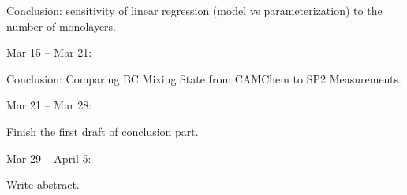 \documentclass[11pt]{article}
\begin{document}
\begin{enumerate}
		Conclusion: sensitivity of linear regression (model vs parameterization) to the number of monolayers.
		
		\bigskip
		\bigskip
		\bigskip
		
		Mar 15 -- Mar 21:
		
		Conclusion: Comparing BC Mixing State from CAMChem to SP2 Measurements.
		
		\bigskip
		
		Mar 21 -- Mar 28:
		
		Finish the first draft of conclusion part.
		
		
		\bigskip
		
		Mar 29 -- April 5:
		
		Write abstract.
		
		
		\bigskip
		
		
		

	
	
	
	
	
	
	
	\end{enumerate}
	
	\clearpage
	
	
	
	
	
	
	
	
	
	
	
	
\end{document}
